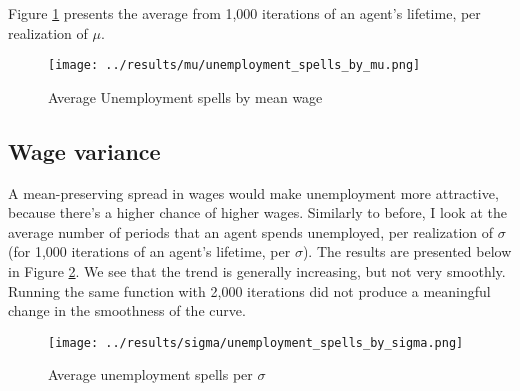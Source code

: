 \documentclass[12pt]{article}
\begin{document}
\vspace{5mm}
Figure \ref{fig:unemployment_spells_by_mu} presents the average from 1,000 iterations of an agent's lifetime, per realization of $\mu$.

\begin{figure}[hbt!]
\centering
\texttt{[image: ../results/mu/unemployment\_spells\_by\_mu.png]}
\caption{Average Unemployment spells by mean wage}
\label{fig:unemployment_spells_by_mu}
\end{figure}


\clearpage


\subsection{Wage variance}

A mean-preserving spread in wages would make unemployment more attractive, because there's a higher chance of higher wages. Similarly to before, I look at the average number of periods that an agent spends unemployed, per realization of $\sigma$ (for 1,000 iterations of an agent's lifetime, per $\sigma$). The results are presented below in Figure \ref{fig:unemployment_spells_by_sigma}. We see that the trend is generally increasing, but not very smoothly. Running the same function with 2,000 iterations did not produce a meaningful change in the smoothness of the curve.

\begin{figure}[hbt!]
\centering
\texttt{[image: ../results/sigma/unemployment\_spells\_by\_sigma.png]}
\caption{Average unemployment spells per $\sigma$}
\label{fig:unemployment_spells_by_sigma}
\end{figure}
\end{document}

